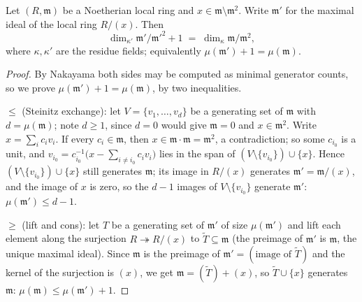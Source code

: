 \begin{theorem}
  \label{pa-thm:cotangent_dim_drop}
  \leanok

  Let \((R, \mathfrak m)\) be a Noetherian local ring and
  \(x \in \mathfrak m \setminus \mathfrak m^2\). Write \(\mathfrak m'\) for the maximal
  ideal of the local ring \(R/(x)\). Then
  \[
    \dim_{\kappa'} \mathfrak m'/\mathfrak m'^2 + 1
      \;=\; \dim_{\kappa} \mathfrak m/\mathfrak m^2,
  \]
  where \(\kappa, \kappa'\) are the residue fields; equivalently
  \(\mu(\mathfrak m') + 1 = \mu(\mathfrak m)\).
\end{theorem}
\begin{proof}
  \leanok
  By Nakayama both sides may be computed as minimal generator counts, so we prove
  \(\mu(\mathfrak m') + 1 = \mu(\mathfrak m)\), by two inequalities.

  \(\leq\) (Steinitz exchange): let \(V = \{v_1, \dots, v_d\}\) be a generating set of
  \(\mathfrak m\) with \(d = \mu(\mathfrak m)\); note \(d \geq 1\), since \(d = 0\)
  would give \(\mathfrak m = 0\) and \(x \in \mathfrak m^2\). Write
  \(x = \sum_i c_i v_i\). If every \(c_i \in \mathfrak m\), then
  \(x \in \mathfrak m \cdot \mathfrak m = \mathfrak m^2\), a contradiction; so some
  \(c_{i_0}\) is a unit, and
  \(v_{i_0} = c_{i_0}^{-1}\bigl(x - \sum_{i \neq i_0} c_i v_i\bigr)\) lies in the span
  of \((V \setminus \{v_{i_0}\}) \cup \{x\}\). Hence
  \((V \setminus \{v_{i_0}\}) \cup \{x\}\) still generates \(\mathfrak m\); its image in
  \(R/(x)\) generates \(\mathfrak m' = \mathfrak m/(x)\), and the image of \(x\) is
  zero, so the \(d - 1\) images of \(V \setminus \{v_{i_0}\}\) generate
  \(\mathfrak m'\): \(\mu(\mathfrak m') \leq d - 1\).

  \(\geq\) (lift and cons): let \(T\) be a generating set of \(\mathfrak m'\) of size
  \(\mu(\mathfrak m')\) and lift each element along the surjection
  \(R \twoheadrightarrow R/(x)\) to \(\widetilde T \subseteq \mathfrak m\) (the
  preimage of \(\mathfrak m'\) is \(\mathfrak m\), the unique maximal ideal). Since
  \(\mathfrak m\) is the preimage of \(\mathfrak m' = (\text{image of } \widetilde T)\)
  and the kernel of the surjection is \((x)\), we get
  \(\mathfrak m = (\widetilde T) + (x)\), so \(\widetilde T \cup \{x\}\) generates
  \(\mathfrak m\): \(\mu(\mathfrak m) \leq \mu(\mathfrak m') + 1\).
\end{proof}

